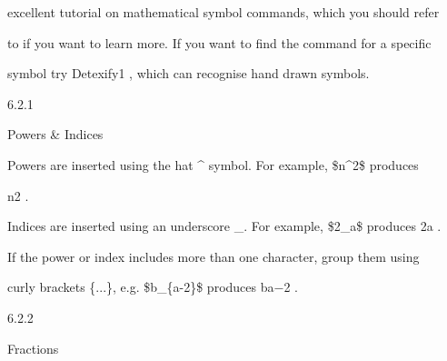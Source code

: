 \documentclass[a4paper,portrait,12pt]{article}
\begin{document}
\begin{flushleft}
excellent tutorial on mathematical symbol commands, which you should refer
\end{flushleft}


\begin{flushleft}
to if you want to learn more. If you want to find the command for a specific
\end{flushleft}


\begin{flushleft}
symbol try Detexify1 , which can recognise hand drawn symbols.
\end{flushleft}





6.2.1





\begin{flushleft}
Powers \& Indices
\end{flushleft}





\begin{flushleft}
Powers are inserted using the hat \^{} symbol. For example, \$n\^{}2\$ produces
\end{flushleft}


\begin{flushleft}
n2 .
\end{flushleft}


\begin{flushleft}
Indices are inserted using an underscore \_. For example, \$2\_a\$ produces 2a .
\end{flushleft}


\begin{flushleft}
If the power or index includes more than one character, group them using
\end{flushleft}


\begin{flushleft}
curly brackets \{...\}, e.g. \$b\_\{a-2\}\$ produces ba$-$2 .
\end{flushleft}





6.2.2





\begin{flushleft}
Fractions
\end{flushleft}
\end{document}
